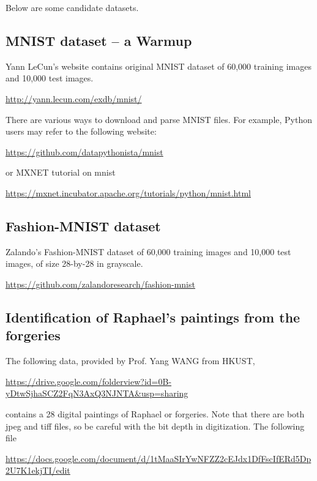\documentclass[11pt]{article}
\begin{document}
Below are some candidate datasets. 

\subsection{MNIST dataset -- a Warmup}

Yann LeCun's website contains original MNIST dataset of 60,000 training images and 10,000 test images. 

\url{http://yann.lecun.com/exdb/mnist/}

There are various ways to download and parse MNIST files. For example, Python users may refer to the following website:

\url{https://github.com/datapythonista/mnist}

or MXNET tutorial on mnist

\url{https://mxnet.incubator.apache.org/tutorials/python/mnist.html}

\subsection{Fashion-MNIST dataset}

Zalando's Fashion-MNIST dataset of 60,000 training images and 10,000 test images, of size 28-by-28 in grayscale. 

\url{https://github.com/zalandoresearch/fashion-mnist}


\subsection{Identification of Raphael's paintings from the forgeries}

The following data, provided by Prof. Yang WANG from HKUST,

\url{https://drive.google.com/folderview?id=0B-yDtwSjhaSCZ2FqN3AxQ3NJNTA&usp=sharing}

\noindent contains a 28 digital paintings of Raphael or forgeries. Note that there are both jpeg and tiff files, so be careful with the bit depth in digitization. The following file

\url{https://docs.google.com/document/d/1tMaaSIrYwNFZZ2cEJdx1DfFscIfERd5Dp2U7K1ekjTI/edit}
\end{document}

